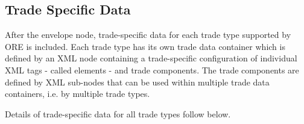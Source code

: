 \subsection{Trade Specific Data}

After the envelope node, trade-specific data for each trade type supported by
ORE is included. 
Each trade type has its own trade data container which is defined by an XML node 
containing a trade-specific
configuration of individual XML tags - called elements - and trade components. 
The trade components are defined by XML
sub-nodes that can be used within multiple trade data containers, i.e.  by multiple trade types.

\medskip

Details of  trade-specific data for all trade types follow below.
